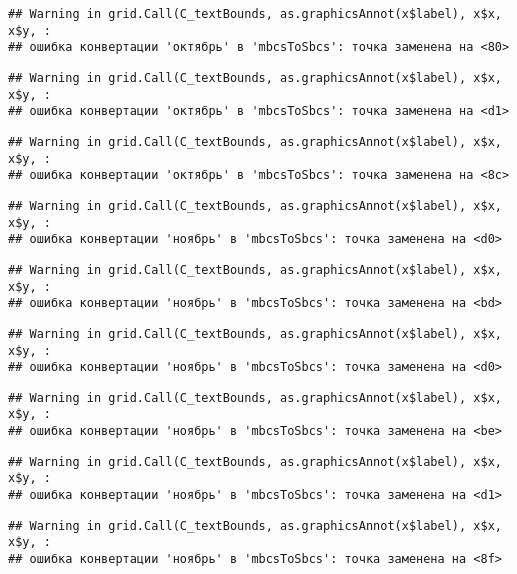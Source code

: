 \documentclass[
]{article}
\begin{document}
\begin{verbatim}
## Warning in grid.Call(C_textBounds, as.graphicsAnnot(x$label), x$x, x$y, :
## ошибка конвертации 'октябрь' в 'mbcsToSbcs': точка заменена на <80>
\end{verbatim}

\begin{verbatim}
## Warning in grid.Call(C_textBounds, as.graphicsAnnot(x$label), x$x, x$y, :
## ошибка конвертации 'октябрь' в 'mbcsToSbcs': точка заменена на <d1>
\end{verbatim}

\begin{verbatim}
## Warning in grid.Call(C_textBounds, as.graphicsAnnot(x$label), x$x, x$y, :
## ошибка конвертации 'октябрь' в 'mbcsToSbcs': точка заменена на <8c>
\end{verbatim}

\begin{verbatim}
## Warning in grid.Call(C_textBounds, as.graphicsAnnot(x$label), x$x, x$y, :
## ошибка конвертации 'ноябрь' в 'mbcsToSbcs': точка заменена на <d0>
\end{verbatim}

\begin{verbatim}
## Warning in grid.Call(C_textBounds, as.graphicsAnnot(x$label), x$x, x$y, :
## ошибка конвертации 'ноябрь' в 'mbcsToSbcs': точка заменена на <bd>
\end{verbatim}

\begin{verbatim}
## Warning in grid.Call(C_textBounds, as.graphicsAnnot(x$label), x$x, x$y, :
## ошибка конвертации 'ноябрь' в 'mbcsToSbcs': точка заменена на <d0>
\end{verbatim}

\begin{verbatim}
## Warning in grid.Call(C_textBounds, as.graphicsAnnot(x$label), x$x, x$y, :
## ошибка конвертации 'ноябрь' в 'mbcsToSbcs': точка заменена на <be>
\end{verbatim}

\begin{verbatim}
## Warning in grid.Call(C_textBounds, as.graphicsAnnot(x$label), x$x, x$y, :
## ошибка конвертации 'ноябрь' в 'mbcsToSbcs': точка заменена на <d1>
\end{verbatim}

\begin{verbatim}
## Warning in grid.Call(C_textBounds, as.graphicsAnnot(x$label), x$x, x$y, :
## ошибка конвертации 'ноябрь' в 'mbcsToSbcs': точка заменена на <8f>
\end{verbatim}
\end{document}
